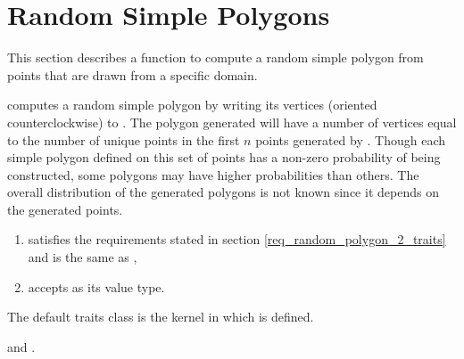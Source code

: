 
\newpage

\ccParDims

\section{Random Simple Polygons}
\label{sec:random_simple_polygons}

This section describes a function to compute a random simple polygon
from points that are drawn from a specific domain.



{
computes a random simple polygon by writing its vertices (oriented
counterclockwise) to . The polygon generated will have a number
of vertices equal to the number of unique points in the first $n$ points
generated by . Though each simple polygon defined on this set of 
points has a non-zero probability of being constructed, some polygons may 
have higher probabilities than others.  The overall distribution of the
generated polygons is not known since it depends on the generated points.
}

\begin{enumerate}
\item {} satisfies the requirements stated in
      section \ref{req_random_polygon_2_traits} and  
      is the same as ,
\item {} accepts  as its
      value type.
\end{enumerate}

The default traits class  is the kernel in which
 is defined.

\ccSeeAlso {} and
.

